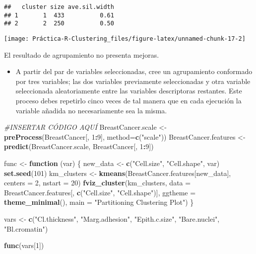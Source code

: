 \documentclass[
]{article}
\newenvironment{Shaded}{\begin{snugshade}}{\end{snugshade}}
\newcommand{\CommentTok}[1]{\textcolor[rgb]{0.56,0.35,0.01}{\textit{#1}}}
\newcommand{\ControlFlowTok}[1]{\textcolor[rgb]{0.13,0.29,0.53}{\textbf{#1}}}
\newcommand{\DataTypeTok}[1]{\textcolor[rgb]{0.13,0.29,0.53}{#1}}
\newcommand{\DecValTok}[1]{\textcolor[rgb]{0.00,0.00,0.81}{#1}}
\newcommand{\KeywordTok}[1]{\textcolor[rgb]{0.13,0.29,0.53}{\textbf{#1}}}
\newcommand{\NormalTok}[1]{#1}
\newcommand{\OperatorTok}[1]{\textcolor[rgb]{0.81,0.36,0.00}{\textbf{#1}}}
\newcommand{\StringTok}[1]{\textcolor[rgb]{0.31,0.60,0.02}{#1}}
\providecommand{\tightlist}{%
  \setlength{\itemsep}{0pt}\setlength{\parskip}{0pt}}
\begin{document}
\begin{verbatim}
##   cluster size ave.sil.width
## 1       1  433          0.61
## 2       2  250          0.50
\end{verbatim}

\begin{center}\texttt{[image: Práctica-R-Clustering\_files/figure-latex/unnamed-chunk-17-2]} \end{center}

El resultado de agrupamiento no presenta mejoras.

\begin{itemize}
\tightlist
\item
  A partir del par de variables seleccionadas, cree un agrupamiento
  conformado por tres variables; las dos variables previamente
  seleccionadas y otra variable seleccionada aleatoriamente entre las
  variables descriptoras restantes. Este proceso debes repetirlo cinco
  veces de tal manera que en cada ejecución la variable añadida no
  necesariamente sea la misma.
\end{itemize}

\begin{Shaded}
\begin{Highlighting}[]
\CommentTok{#INSERTAR CÓDIGO AQUÍ}
\NormalTok{BreastCancer.scale <-}\StringTok{ }\KeywordTok{preProcess}\NormalTok{(BreastCancer[, }\DecValTok{1}\OperatorTok{:}\DecValTok{9}\NormalTok{], }\DataTypeTok{method=}\KeywordTok{c}\NormalTok{(}\StringTok{"scale"}\NormalTok{))}
\NormalTok{BreastCancer.features <-}\StringTok{ }\KeywordTok{predict}\NormalTok{(BreastCancer.scale, BreastCancer[, }\DecValTok{1}\OperatorTok{:}\DecValTok{9}\NormalTok{])}

\NormalTok{func <-}\StringTok{ }\ControlFlowTok{function}\NormalTok{ (var) \{ }
\NormalTok{  new_data <-}\StringTok{ }\KeywordTok{c}\NormalTok{(}\StringTok{"Cell.size"}\NormalTok{, }\StringTok{"Cell.shape"}\NormalTok{, var)}
  \KeywordTok{set.seed}\NormalTok{(}\DecValTok{101}\NormalTok{)}
\NormalTok{  km_clusters <-}\StringTok{ }\KeywordTok{kmeans}\NormalTok{(BreastCancer.features[new_data], }\DataTypeTok{centers =} \DecValTok{2}\NormalTok{, }\DataTypeTok{nstart =} \DecValTok{20}\NormalTok{)}
  \KeywordTok{fviz_cluster}\NormalTok{(km_clusters, }\DataTypeTok{data =}\NormalTok{ BreastCancer.features[, }\KeywordTok{c}\NormalTok{(}\StringTok{"Cell.size"}\NormalTok{, }\StringTok{"Cell.shape"}\NormalTok{)],}
             \DataTypeTok{ggtheme =} \KeywordTok{theme_minimal}\NormalTok{(),}
             \DataTypeTok{main =} \StringTok{"Partitioning Clustering Plot"}\NormalTok{)}
\NormalTok{\}}

\NormalTok{vars <-}\StringTok{ }\KeywordTok{c}\NormalTok{(}\StringTok{"Cl.thickness"}\NormalTok{, }\StringTok{"Marg.adhesion"}\NormalTok{, }\StringTok{"Epith.c.size"}\NormalTok{, }\StringTok{"Bare.nuclei"}\NormalTok{, }\StringTok{"Bl.cromatin"}\NormalTok{)}

\KeywordTok{func}\NormalTok{(vars[}\DecValTok{1}\NormalTok{])}
\end{Highlighting}
\end{Shaded}
\end{document}
